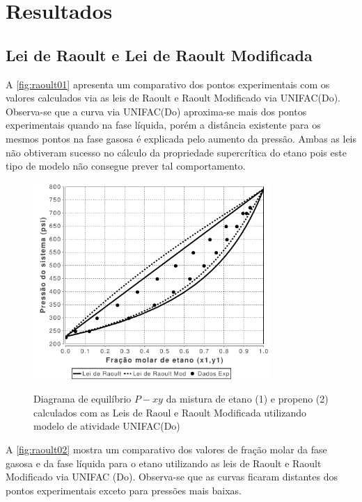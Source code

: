 \section{Resultados}



\subsection{Lei de Raoult e Lei de Raoult Modificada}

A \autoref{fig:raoult01} apresenta um comparativo dos pontos experimentais com
os valores calculados via as leis de Raoult e Raoult Modificado via UNIFAC(Do).
Observa-se que a curva via UNIFAC(Do) aproxima-se mais dos pontos experimentais
quando na fase líquida, porém a distância existente para os mesmos pontos na
fase gasosa é explicada pelo aumento da pressão. Ambas as leis não obtiveram
sucesso no cálculo da propriedade supercrítica do etano pois este tipo de
modelo não consegue prever tal comportamento.

\begin{figure}[htb]
\centering
{\includegraphics[width=0.8\textwidth]{img/VLE-Ethane(1)Propylene(2)-x1y1&Pressure-Raoult-RaoultMod.pdf}}
\caption{Diagrama de equilíbrio $P-xy$ da mistura de etano (1) e
propeno (2) calculados com as Leis de Raoul e Raoult Modificada utilizando
modelo de atividade UNIFAC(Do)}
\label{fig:raoult01}
\end{figure}

A \autoref{fig:raoult02} mostra um comparativo dos valores de fração molar da
fase gasosa e da fase líquida para o etano utilizando as leis de Raoult e Raoult
Modificado via UNIFAC (Do). Observa-se que as curvas ficaram distantes dos
pontos experimentais exceto para pressões mais baixas.

